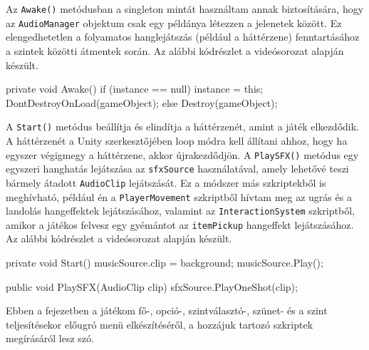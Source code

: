 Az \texttt{Awake()} metódusban a singleton mintát használtam annak biztosítására, hogy az \texttt{AudioManager} objektum csak egy példánya létezzen a jelenetek között. Ez elengedhetetlen a folyamatos hanglejátszás (például a háttérzene) fenntartásához a szintek közötti átmentek során. Az alábbi kódrészlet a \cite{youtubeplaylist} videósorozat alapján készült.

\begin{java}
private void Awake()
{
    if (instance == null)
    {
        instance = this;
        DontDestroyOnLoad(gameObject);
    }
    else 
    {
        Destroy(gameObject);
    }
}
\end{java}

A \texttt{Start()} metódus beállítja és elindítja a háttérzenét, amint a játék elkezdődik. A háttérzenét a Unity szerkesztőjében loop módra kell állítani ahhoz, hogy ha egyszer végigmegy a háttérzene, akkor újrakezdődjön. A \texttt{PlaySFX()} metódus egy egyszeri hanghatás lejátszása az \texttt{sfxSource} használatával, amely lehetővé teszi bármely átadott \texttt{AudioClip} lejátszását. Ez a módszer más szkriptekből is meghívható, például én a \texttt{PlayerMovement} szkriptből hívtam meg az ugrás és a landolás hangeffektek lejátszásához, valamint az \texttt{InteractionSystem} szkriptből, amikor a játékos felvesz egy gyémántot az \texttt{itemPickup} hangeffekt lejátszásához. Az alábbi kódrészlet a \cite{youtubeplaylist} videósorozat alapján készült.

\begin{java}
private void Start()
{
    musicSource.clip = background;
    musicSource.Play();
}

public void PlaySFX(AudioClip clip)
{
    sfxSource.PlayOneShot(clip);
}
\end{java}


Ebben a fejezetben a játékom fő-, opció-, szintválasztó-, szünet- és a szint teljesítésekor előugró menü elkészítéséről, a hozzájuk tartozó szkriptek megírásáról lesz szó.


